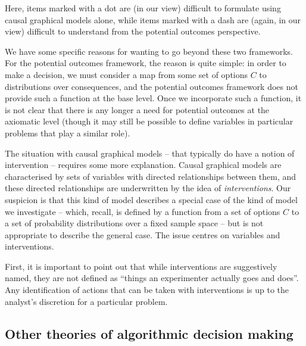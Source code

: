 Here, items marked with a dot are (in our view) difficult to formulate using causal graphical models alone, while items marked with a dash are (again, in our view) difficult to understand from the potential outcomes perspective.

We have some specific reasons for wanting to go beyond these two frameworks. For the potential outcomes framework, the reason is quite simple: in order to make a decision, we must consider a map from some set of options $C$ to distributions over consequences, and the potential outcomes framework does not provide such a function at the base level. Once we incorporate such a function, it is not clear that there is any longer a need for potential outcomes at the axiomatic level (though it may still be possible to define variables in particular problems that play a similar role).

The situation with causal graphical models -- that typically do have a notion of intervention -- requires some more explanation. Causal graphical models are characterised by sets of variables with directed relationships between them, and these directed relationships are underwritten by the idea of \emph{interventions}. Our suspicion is that this kind of model describes a special case of the kind of model we investigate -- which, recall, is defined by a function from a set of options $C$ to a set of probability distributions over a fixed sample space -- but is not appropriate to describe the general case. The issue centres on variables and interventions.

First, it is important to point out that while interventions are suggestively named, they are not defined as ``things an experimenter actually goes and does''. Any identification of actions that can be taken with interventions is up to the analyst's discretion for a particular problem. 


\subsection[Other theories]{Other theories of algorithmic decision making}

